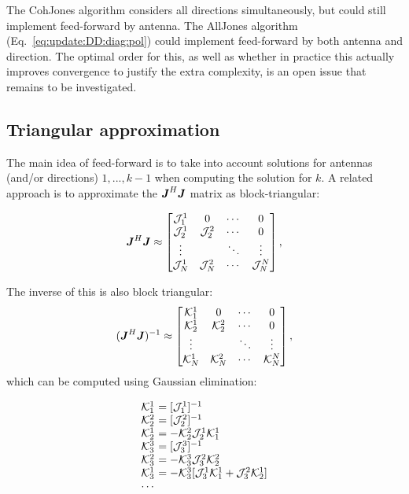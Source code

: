 \documentclass[useAMS,usenatbib]{mn2e}
\newcommand{\mat}[1]{{\bmath{#1}}}
\newcommand{\JJ}{\mat{J}} %
\newcommand{\JHJ}{\JJ^H\JJ} %
\begin{document}
The {\sc CohJones} algorithm considers all directions simultaneously, but could still implement feed-forward by antenna.
The {\sc AllJones} algorithm (Eq.~\ref{eq:update:DD:diag:pol}) could implement feed-forward by both antenna and direction. 
The optimal order for this, as well as whether in practice this actually improves convergence to justify the extra 
complexity, is an open issue that remains to be investigated.

\subsection{Triangular approximation}

The main idea of feed-forward is to take into account solutions for antennas (and/or directions) $1,...,k-1$ when computing the
solution for $k$. A related approach is to approximate the $\JHJ$ matrix as block-triangular:

\begin{equation}
\label{eq:JHJ:DD:block-triag}
\JHJ \approx \Matrix{cccc}{
\JJJ^1_1 & 0 & \cdots & 0 \\
\JJJ^1_2 & \JJJ^2_2 & \cdots & 0 \\
\vdots & & \ddots &  \vdots \\
\JJJ_{N}^1 & \JJJ_{N}^2 & \cdots & \JJJ_{N}^{N} },
\end{equation}

\newcommand{\KKK}{\mathcal{K}}

The inverse of this is also block triangular:
\begin{equation}
\label{eq:JHJ:DD:block-triag-inv}
(\JHJ)^{-1} \approx \Matrix{cccc}{
\KKK^1_1 & 0 & \cdots & 0 \\
\KKK^1_2 & \KKK^2_2 & \cdots & 0 \\
\vdots & & \ddots &  \vdots \\
\KKK_{N}^1 & \KKK_{N}^2 & \cdots & \KKK_{N}^{N} },
\end{equation}
which can be computed using Gaussian elimination:

\[
\begin{array}{l@{~}l}
\KKK^1_1 &= [\JJJ^1_1]^{-1} \\
\KKK^2_2 &= [\JJJ^2_2]^{-1} \\
\KKK^1_2 &= - \KKK^2_2 \JJJ^1_2 \KKK^1_1\\
\KKK^3_3 &= [\JJJ^3_3]^{-1} \\
\KKK^2_3 &= - \KKK^3_3 \JJJ^2_3 \KKK^2_2\\
\KKK^1_3 &= - \KKK^3_3 [ \JJJ^1_3 \KKK^1_1 + \JJJ^2_3 \KKK^1_2  ]\\
\cdots
\end{array}
\]
\end{document}
